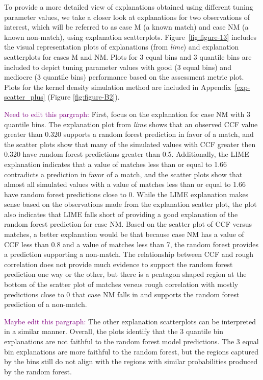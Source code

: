 \documentclass[AMS,STIX2COL]{WileyNJD-v2}\usepackage[]{graphicx}\usepackage[]{color}
\newcommand{\kgc}[1]{\textcolor{purple}{#1}}
\begin{document}
To provide a more detailed view of explanations obtained using different tuning parameter values, we take a closer look at explanations for two observations of interest, which will be referred to as case M (a known match) and case NM (a known non-match), using explanation scatterplots. Figure~\ref{fig:figure-13} includes the visual representation plots of explanations (from \emph{lime}) and explanation scatterplots for cases M and NM. Plots for 3 equal bins and 3 quantile bins are included to depict tuning parameter values with good (3 equal bins) and mediocre (3 quantile bins) performance based on the assessment metric plot. Plots for the kernel density simulation method are included in Appendix~\ref{exp-scatter_plus} (Figure \ref{fig:figure-B2}). 

\kgc{Need to edit this pargraph:} First, focus on the explanation for case NM with 3 quantile bins. The explanation plot from \emph{lime} shows that an observed CCF value greater than 0.320 supports a random forest prediction in favor of a match, and the scatter plots show that many of the simulated values with CCF greater then 0.320 have random forest predictions greater than 0.5. Additionally, the LIME explanation indicates that a value of matches less than or equal to 1.66 contradicts a prediction in favor of a match, and the scatter plots show that almost all simulated values with a value of matches less than or equal to 1.66 have random forest predictions close to 0. While the LIME explanation makes sense based on the observations made from the explanation scatter plot, the plot also indicates that LIME falls short of providing a good explanation of the random forest prediction for case NM. Based on the scatter plot of CCF versus matches, a better explanation would be that because case NM has a value of CCF less than 0.8 and a value of matches less than 7, the random forest provides a prediction supporting a non-match. The relationship between CCF and rough correlation does not provide much evidence to support the random forest prediction one way or the other, but there is a pentagon shaped region at the bottom of the scatter plot of matches versus rough correlation with mostly predictions close to 0 that case NM falls in and supports the random forest prediction of a non-match.

\kgc{Maybe edit this pargraph:} The other explanation scatterplots can be interpreted in a similar manner. Overall, the plots identify that the 3 quantile bin explanations are not faithful to the random forest model predictions. The 3 equal bin explanations are more faithful to the random forest, but the regions captured by the bins still do not align with the regions with similar probabilities produced by the random forest.
\end{document}
